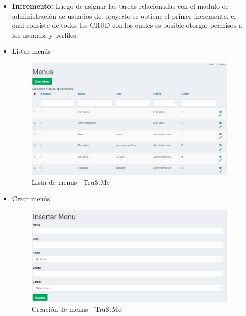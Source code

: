 {{	\begin{itemize}
		
		\item \textbf{Incremento:} Luego de asignar las tareas relacionadas con el módulo de administración de usuarios del proyecto se obtiene el primer incremento, el cual consiste de todos los CRUD con los cuales es posible otorgar permisos a los usuarios y perfiles.
			
		
		\item Listar menús
			\begin{figure}[H]
				\centering
				\includegraphics[width=1\linewidth]{development/listarmenu.png}
				\caption{Lista de menus - Tru\$tMe}
			\end{figure}
		
		\item Crear menús
		\begin{figure}[H]
			\centering
			\includegraphics[width=1\linewidth]{development/crearmenu.png}
			\caption{Creación de menus - Tru\$tMe}
		\end{figure}
	

\end{itemize}}}
